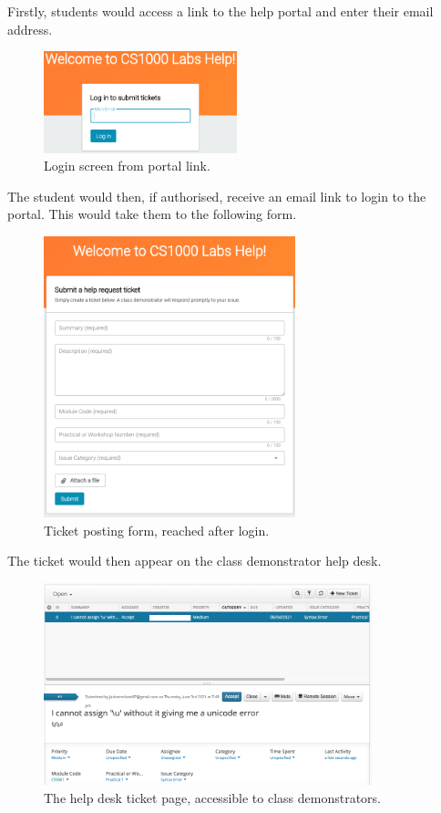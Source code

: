 \documentclass[a4paper,11pt]{article}
\begin{document}
Firstly, students would access a link to the help portal and enter their email address.

\FloatBarrier
\begin{figure}[H]
  \centering
  \includegraphics[width=0.5\textwidth]{SWportalLogin.png}
  \caption{Login screen from portal link.}
\end{figure}

The student would then, if authorised, receive an email link to login to the portal. This would take them to the following form.

\FloatBarrier
\begin{figure}[H]
  \centering
  \includegraphics[width=0.65\textwidth]{SWpostTicket.png}
  \caption{Ticket posting form, reached after login.}
\end{figure}

The ticket would then appear on the class demonstrator help desk.

\FloatBarrier
\begin{figure}[H]
  \centering
  \includegraphics[width=0.85\textwidth]{SWticketPage.png}
  \caption{The help desk ticket page, accessible to class demonstrators.}
\end{figure}
\end{document}
